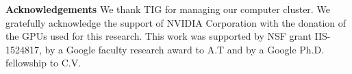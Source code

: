\documentclass[10pt,journal,compsoc]{IEEEtran}
\begin{document}
\textbf{Acknowledgements} We thank TIG for managing our computer cluster. We gratefully acknowledge the support of NVIDIA Corporation with the donation of the GPUs used for this research. This work was supported by NSF grant IIS-1524817, by a Google faculty research award to A.T and by a Google Ph.D. fellowship to C.V.





{


}

\vfill\eject
\end{document}

